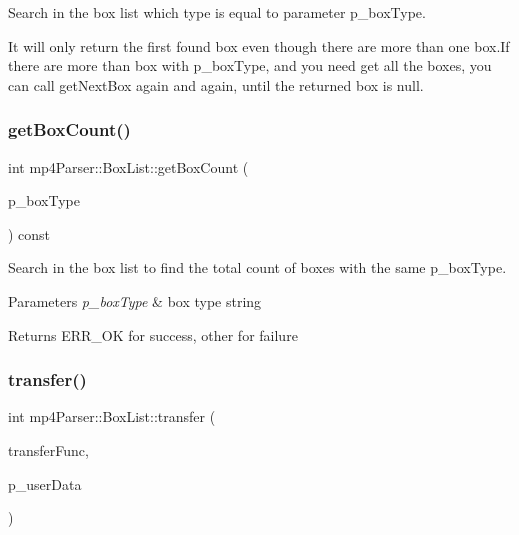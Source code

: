 Search in the box list which type is equal to parameter p\+\_\+box\+Type. 

It will only return the first found box even though there are more than one box.\+If there are more than box with p\+\_\+box\+Type, and you need get all the boxes, you can call get\+Next\+Box again and again, until the returned box is null. \mbox{\label{classmp4_parser_1_1_box_list_ac8f02d0f68e98f348019268127eba98a}} 
\subsubsection{\texorpdfstring{getBoxCount()}{getBoxCount()}}
{\footnotesize\ttfamily int mp4\+Parser\+::\+Box\+List\+::get\+Box\+Count (\begin{DoxyParamCaption}\item[{const char $\ast$}]{p\+\_\+box\+Type }\end{DoxyParamCaption}) const}



Search in the box list to find the total count of boxes with the same p\+\_\+box\+Type. 


\begin{DoxyParams}{Parameters}
{\em p\+\_\+box\+Type} & box type string \\
\hline
\end{DoxyParams}
\begin{DoxyReturn}{Returns}
E\+R\+R\+\_\+\+OK for success, other for failure 
\end{DoxyReturn}
\mbox{\label{classmp4_parser_1_1_box_list_a81f1fd91e205e558a4ac89c481179483}} 
\subsubsection{\texorpdfstring{transfer()}{transfer()}}
{\footnotesize\ttfamily int mp4\+Parser\+::\+Box\+List\+::transfer (\begin{DoxyParamCaption}\item[{Transfer\+Func\+\_\+t}]{transfer\+Func,  }\item[{void $\ast$}]{p\+\_\+user\+Data }\end{DoxyParamCaption})}



